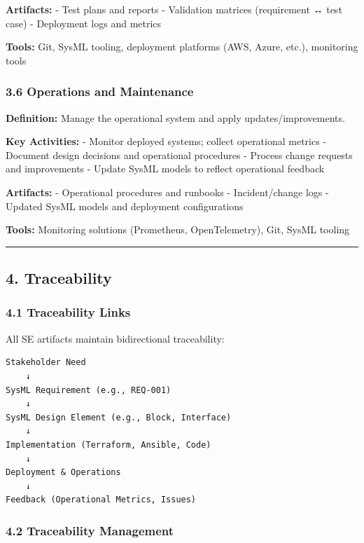 \documentclass[12pt]{article}
\begin{document}
\textbf{Artifacts:} - Test plans and reports - Validation matrices
(requirement ↔ test case) - Deployment logs and metrics

\textbf{Tools:} Git, SysML tooling, deployment platforms (AWS, Azure,
etc.), monitoring tools

\subsubsection{3.6 Operations and
Maintenance}\label{operations-and-maintenance}

\textbf{Definition:} Manage the operational system and apply
updates/improvements.

\textbf{Key Activities:} - Monitor deployed systems; collect operational
metrics - Document design decisions and operational procedures - Process
change requests and improvements - Update SysML models to reflect
operational feedback

\textbf{Artifacts:} - Operational procedures and runbooks -
Incident/change logs - Updated SysML models and deployment
configurations

\textbf{Tools:} Monitoring solutions (Prometheus, OpenTelemetry), Git,
SysML tooling

\begin{center}\rule{0.5\linewidth}{0.5pt}\end{center}

\subsection{4. Traceability}\label{traceability}

\subsubsection{4.1 Traceability Links}\label{traceability-links}

All SE artifacts maintain bidirectional traceability:

\begin{verbatim}
Stakeholder Need
    ↓
SysML Requirement (e.g., REQ-001)
    ↓
SysML Design Element (e.g., Block, Interface)
    ↓
Implementation (Terraform, Ansible, Code)
    ↓
Deployment & Operations
    ↓
Feedback (Operational Metrics, Issues)
\end{verbatim}

\subsubsection{4.2 Traceability
Management}\label{traceability-management}
\end{document}
